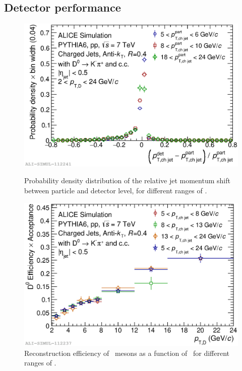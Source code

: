 \documentclass[a4paper]{jpconf}
\begin{document}
\subsection{Detector performance}
\label{sect:detperf}
\begin{figure}[tb]
\centering
\begin{minipage}{.48\textwidth}
\includegraphics[width=\textwidth]{img/HQ16_Simulation_DetectorResponse}
\caption{\label{fig:HQ16_Simulation_DetectorResponse} Probability density distribution of the relative jet momentum shift between particle and detector level, for different ranges of \ptchjet.}
\end{minipage}\hspace{1pc}%
\begin{minipage}{.48\textwidth}
\includegraphics[width=\textwidth]{img/HQ16_Simulation_EfficiencyVsDPt}
\caption{\label{fig:HQ16_Simulation_EfficiencyVsDPt}Reconstruction efficiency of \Dzero\ mesons as a function of \ptd\ for different ranges of \ptchjet.}
\end{minipage} 
\end{figure}
\end{document}
